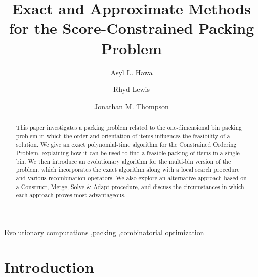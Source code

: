 \documentclass[a4paper,11pt,authoryear]{elsarticle}
\begin{document}
	
\begin{frontmatter}
\title{Exact and Approximate Methods for the Score-Constrained Packing Problem}
\author{Asyl L. Hawa}

\author{Rhyd Lewis}

\author{Jonathan M. Thompson}

\address{School of Mathematics, Cardiff University, Senghennydd Road, Cardiff, CF24 4AG, UK}
\begin{abstract}
This paper investigates a packing problem related to the one-dimensional bin packing problem in which the order and orientation of items influences the feasibility of a solution. We give an exact polynomial-time algorithm for the Constrained Ordering Problem, explaining how it can be used to find a feasible packing of items in a single bin. We then introduce an evolutionary algorithm for the multi-bin version of the problem, which incorporates the exact algorithm along with a local search procedure and various recombination operators. We also explore an alternative approach based on a Construct, Merge, Solve $\&$ Adapt procedure, and discuss the circumstances in which each approach proves most advantageous.
\end{abstract}

\begin{keyword}
	Evolutionary computations \sep packing \sep combinatorial optimization
\end{keyword}

\end{frontmatter}

\section{Introduction}
\label{sec:intro}
\end{document}
